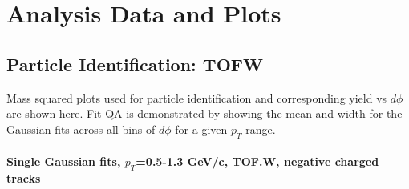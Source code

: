 \chapter{Analysis Data and Plots} %
\label{app:data}

\section{Particle Identification: TOFW}

Mass squared plots used for particle identification and corresponding yield vs $d\phi$ are shown here. Fit QA is demonstrated by showing the mean and width for the Gaussian fits across all bins of $d\phi$ for a given $p_T$ range.

\subsubsection{Single Gaussian fits, $p_T$=0.5-1.3 GeV/c, TOF.W, negative charged tracks}
\label{app:singlegauss}
